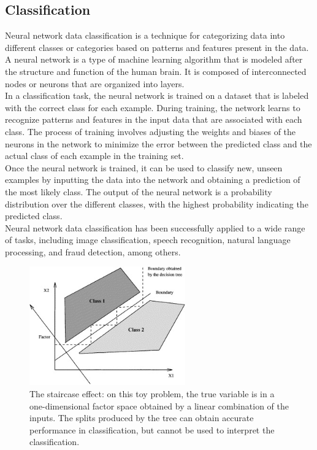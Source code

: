 \subsection{Classification} \label{subsec:clasification}
Neural network data classification is a technique for categorizing data into different classes or categories based on
patterns and features present in the data. A neural network is a type of machine learning algorithm that is modeled
after the structure and function of the human brain. It is composed of interconnected nodes or neurons that are
organized into layers.\\
In a classification task, the neural network is trained on a dataset that is labeled with the correct
class for each example. During training, the network learns to recognize patterns and features in the input data
that are associated with each class. The process of training involves adjusting the weights and biases of the neurons
in the network to minimize the error between the predicted class and the actual class of each example in the
training set.\\
Once the neural network is trained, it can be used to classify new, unseen examples by inputting the data into
the network and obtaining a prediction of the most likely class. The output of the neural network is a probability
distribution over the different classes, with the highest probability indicating the predicted class.\\
Neural network data classification has been successfully applied to a wide range of tasks, including image
classification, speech recognition, natural language processing, and fraud detection, among others.
\begin{center}
    \begin{figure}[!ht]
        \centering
        \includegraphics[width=0.6\textwidth]{figures/classification}
        \caption{The staircase effect: on this toy problem, the true variable is in a one-dimensional factor space
        obtained by a linear combination of the inputs. The splits produced by the tree can obtain accurate
        performance in classification, but cannot be used to interpret the classification.\cite{feraud2002methodology} }
        \label{fig:tahn}
    \end{figure}
\end{center}

